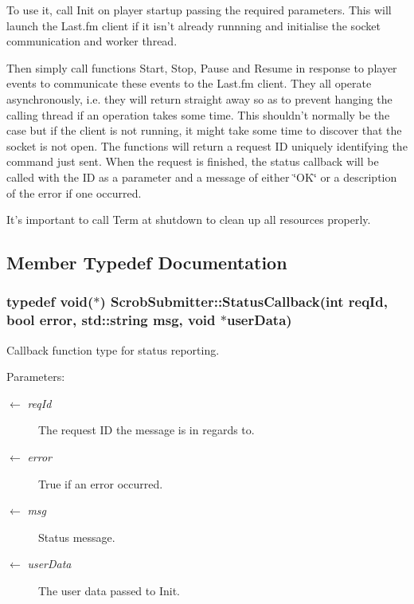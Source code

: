 To use it, call Init on player startup passing the required parameters. This will launch the Last.fm client if it isn't already runnning and initialise the socket communication and worker thread.

Then simply call functions Start, Stop, Pause and Resume in response to player events to communicate these events to the Last.fm client. They all operate asynchronously, i.e. they will return straight away so as to prevent hanging the calling thread if an operation takes some time. This shouldn't normally be the case but if the client is not running, it might take some time to discover that the socket is not open. The functions will return a request ID uniquely identifying the command just sent. When the request is finished, the status callback will be called with the ID as a parameter and a message of either \char`\"{}OK\char`\"{} or a description of the error if one occurred.

It's important to call Term at shutdown to clean up all resources properly. 



\subsection{Member Typedef Documentation}
\subsubsection{\setlength{\rightskip}{0pt plus 5cm}typedef void($\ast$) {\bf ScrobSubmitter::StatusCallback}(int reqId, bool error, std::string msg, void $\ast$userData)}\label{class_scrob_submitter_1f22481471ffffa3d1677a81303c3ff1}


Callback function type for status reporting.

\begin{Desc}
\item[Parameters:]
\begin{description}
\item[\mbox{$\leftarrow$} {\em reqId}]The request ID the message is in regards to. \item[\mbox{$\leftarrow$} {\em error}]True if an error occurred. \item[\mbox{$\leftarrow$} {\em msg}]Status message. \item[\mbox{$\leftarrow$} {\em userData}]The user data passed to Init. \end{description}
\end{Desc}


